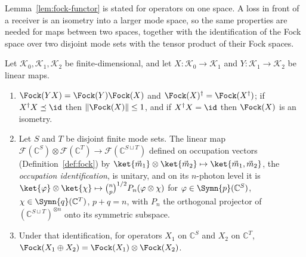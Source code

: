 
Lemma~\ref{lem:fock-functor} is stated for operators on one space. A loss in
front of a receiver is an isometry into a larger mode space, so the same
properties are needed for maps between two spaces, together with the
identification of the Fock space over two disjoint mode sets with the tensor
product of their Fock spaces.

\begin{lemma}\label{lem:fock-maps}
Let $\mathcal{K}_0,\mathcal{K}_1,\mathcal{K}_2$ be finite-dimensional, and let
$X\colon\mathcal{K}_0\to\mathcal{K}_1$ and $Y\colon\mathcal{K}_1\to\mathcal{K}_2$
be linear maps.
\begin{enumerate}[label=(\roman*),leftmargin=3.0em]
\item $\Fock(YX)=\Fock(Y)\Fock(X)$ and $\Fock(X)^{\dagger}=\Fock(X^{\dagger})$;
  if $X^{\dagger}X\preceq\id$ then $\lVert\Fock(X)\rVert\le1$, and if
  $X^{\dagger}X=\id$ then $\Fock(X)$ is an isometry.
\item Let $S$ and $T$ be disjoint finite mode sets. The linear map
  $\mathcal{F}(\mathbb{C}^{S})\otimes\mathcal{F}(\mathbb{C}^{T})\to
  \mathcal{F}(\mathbb{C}^{S\sqcup T})$ defined on occupation vectors
  (Definition~\ref{def:fock}) by
  $\ket{\vec m_1}\otimes\ket{\vec m_2}\mapsto\ket{\vec m_1,\vec m_2}$, the
  \emph{occupation identification},
  is unitary, and on its $n$-photon level it is
  $\ket{\varphi}\otimes\ket{\chi}\mapsto\binom{n}{p}^{1/2}P_n(\varphi\otimes\chi)$
  for $\varphi\in\Symn{p}(\mathbb{C}^{S})$, $\chi\in\Symn{q}(\mathbb{C}^{T})$,
  $p+q=n$, with $P_n$ the orthogonal projector of
  $(\mathbb{C}^{S\sqcup T})^{\otimes n}$ onto its symmetric subspace.
\item Under that identification, for operators $X_1$ on $\mathbb{C}^{S}$ and
  $X_2$ on $\mathbb{C}^{T}$,
  $\Fock(X_1\oplus X_2)=\Fock(X_1)\otimes\Fock(X_2)$.
\end{enumerate}
\end{lemma}

